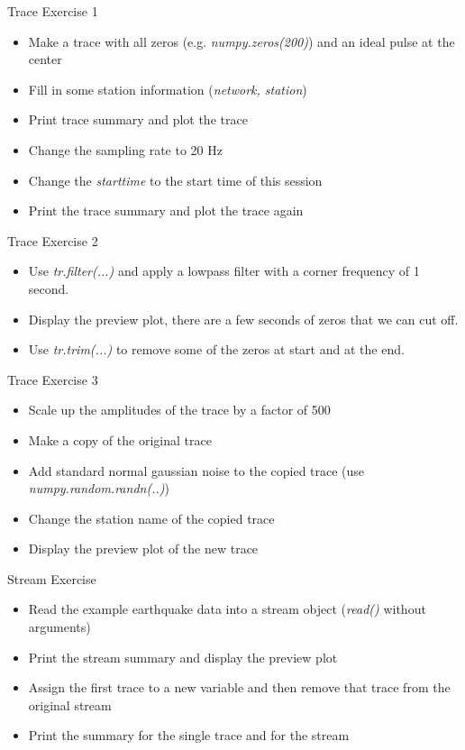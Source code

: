 \begin{frame}{Trace Exercise 1}
    \begin{itemize}
        \item Make a trace with all zeros (e.g. \textit{numpy.zeros(200)}) and an ideal pulse at the center
        \item Fill in some station information (\textit{network, station})
        \item Print trace summary and plot the trace
        \item Change the sampling rate to 20 Hz
        \item Change the \textit{starttime} to the start time of this session
        \item Print the trace summary and plot the trace again
    \end{itemize}
\end{frame}

\begin{frame}{Trace Exercise 2}
    \begin{itemize}
        \item Use \textit{tr.filter(...)} and apply a lowpass filter with a corner frequency of 1 second.
        \item Display the preview plot, there are a few seconds of zeros that we can cut off.
        \item Use \textit{tr.trim(...)} to remove some of the zeros at start and at the end.
    \end{itemize}
\end{frame}


\begin{frame}{Trace Exercise 3}
    \begin{itemize}
        \item Scale up the amplitudes of the trace by a factor of 500
        \item Make a copy of the original trace
        \item Add standard normal gaussian noise to the copied trace (use \textit{numpy.random.randn(..)})
        \item Change the station name of the copied trace
        \item Display the preview plot of the new trace
    \end{itemize}
\end{frame}


\begin{frame}{Stream Exercise}
    \begin{itemize}
        \item Read the example earthquake data into a stream object (\textit{read()} without arguments)
        \item Print the stream summary and display the preview plot
        \item Assign the first trace to a new variable and then remove that trace from the original stream
        \item Print the summary for the single trace and for the stream
    \end{itemize}
\end{frame}


